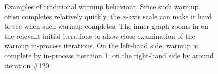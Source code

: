 \documentclass[preprint,numbers,10pt]{sigplanconf}
\begin{document}
\begin{figure}[tbp]
\caption{Examples of traditional warmup behaviour. Since such warmup often completes
relatively quickly, the $x$-axis scale can make it hard to see when such warmup
completes. The inner graph zooms in on the relevant initial iterations to allow
close examination of the warmup in-process iterations. On the left-hand side,
warmup is complete by in-process iteration 1; on the right-hand side by around
iteration \#120.}
\label{fig:examples:trad}
\end{figure}
\end{document}
